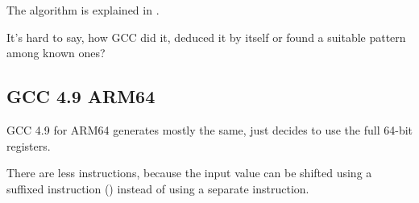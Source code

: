 The algorithm is explained in .

It's hard to say, how GCC did it, deduced it by itself or found a suitable pattern among known ones?

\subsection{\Optimizing GCC 4.9 ARM64}

GCC 4.9 for ARM64 generates mostly the same, just decides to use the full 64-bit registers.

There are less instructions, because the input value can be shifted using a suffixed instruction ()
instead of using a separate instruction.


